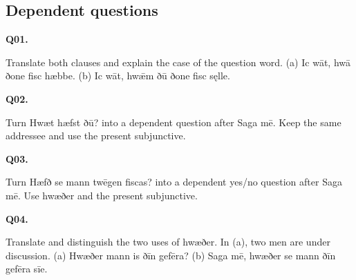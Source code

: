 \subsection*{Dependent questions}

\par\begin{minipage}{\linewidth}\raggedright
\textbf{Q01.}

Translate both clauses and explain the case of the question word. (a) Ic wāt, hwā ðone fisc hæbbe. (b) Ic wāt, hwǣm ðū ðone fisc sęlle.

\end{minipage}\par\addvspace{4pt}

\par\begin{minipage}{\linewidth}\raggedright
\textbf{Q02.}

Turn Hwæt hæfst ðū? into a dependent question after Saga mē. Keep the same addressee and use the present subjunctive.

\end{minipage}\par\addvspace{4pt}

\par\begin{minipage}{\linewidth}\raggedright
\textbf{Q03.}

Turn Hæfð se mann twēgen fiscas? into a dependent yes/\allowbreak{}no question after Saga mē. Use hwæðer and the present subjunctive.

\end{minipage}\par\addvspace{4pt}

\par\begin{minipage}{\linewidth}\raggedright
\textbf{Q04.}

Translate and distinguish the two uses of hwæðer. In (a), two men are under discussion. (a) Hwæðer mann is ðīn gefēra? (b) Saga mē, hwæðer se mann ðīn gefēra sīe.

\end{minipage}\par\addvspace{4pt}

